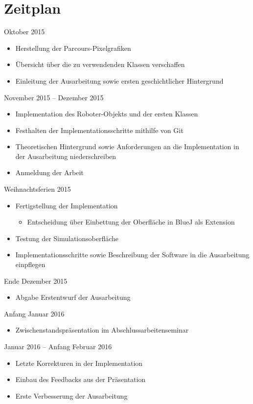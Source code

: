 \documentclass[paper=a4, pagesize, DIV=calc, BCOR=12.5mm, twoside=off, onecolumn=on, open = any, titlepage =on, parskip =half-, headsepline = on, footsepline = on, chapterprefix = on, appendixprefix = off, fontsize = 12pt, numbers = noenddot, abstract = on]{scrbook}
\numberwithin{equation}{chapter}
\begin{document}
\par \singlespacing
\section*{Zeitplan}
\onehalfspacing
Oktober 2015 
\begin{itemize}
\item Herstellung der Parcours-Pixelgrafiken
\item	Übersicht über die zu verwendenden Klassen verschaffen
\item	Einleitung der Ausarbeitung sowie ersten geschichtlicher Hintergrund
\end{itemize}

November 2015 – Dezember 2015
\begin{itemize}
\item	Implementation des Roboter-Objekts und der ersten Klassen
\item	Festhalten der Implementationsschritte mithilfe von Git
\item	Theoretischen Hintergrund sowie Anforderungen an die Implementation in der Ausarbeitung niederschreiben
\item	Anmeldung der Arbeit
\end{itemize}

Weihnachtsferien 2015 
\begin{itemize}
\item	Fertigstellung der Implementation
\begin{itemize}
\item Entscheidung über Einbettung der Oberfläche in BlueJ als Extension
\end{itemize}
\item	Testung der Simulationsoberfläche
\item	Implementationsschritte sowie Beschreibung der Software in die Ausarbeitung einpflegen
\end{itemize}

Ende Dezember 2015
\begin{itemize}
\item 	Abgabe Erstentwurf der Ausarbeitung
\end{itemize}

Anfang Januar 2016
\begin{itemize}
\item Zwischenstandspräsentation im Abschlussarbeitenseminar
\end{itemize}

Januar 2016 – Anfang Februar 2016
\begin{itemize}
\item Letzte Korrekturen in der Implementation
\item	Einbau des Feedbacks aus der Präsentation
\item	Erste Verbesserung der Ausarbeitung
\end{itemize}
\end{document}
